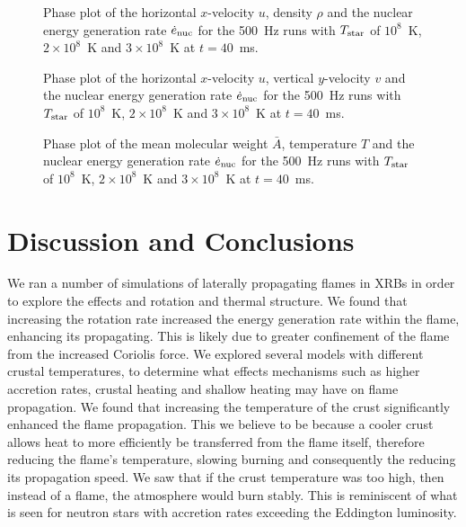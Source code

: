 \documentclass[preprint,times,tighten]{aastex63}
\begin{document}
\begin{figure}[t]
    \centering
    \caption{\label{fig:urho_hot}Phase plot of the horizontal $x$-velocity $u$, density $\rho$ and the nuclear energy generation rate $\dot{e}_{\rm nuc}$ for the 500~Hz runs with $T_{\rm star}$ of $10^8$~K, $2\times10^8$~K and $3\times10^8$~K at $t = 40$~ms.}
\end{figure}

\begin{figure}[t]
    \centering
    \caption{\label{fig:uv_hot}Phase plot of the horizontal $x$-velocity $u$, vertical $y$-velocity $v$ and the nuclear energy generation rate $\dot{e}_{\rm nuc}$ for the 500~Hz runs with $T_{\rm star}$ of $10^8$~K, $2\times10^8$~K and $3\times10^8$~K at $t = 40$~ms.}
\end{figure}

\begin{figure}[t]
    \centering
    \caption{\label{fig:abar_hot}Phase plot of the mean molecular weight $\bar{A}$, temperature $T$ and the nuclear energy generation rate $\dot{e}_{\rm nuc}$ for the 500~Hz runs with $T_{\rm star}$ of $10^8$~K, $2\times10^8$~K and $3\times10^8$~K at $t = 40$~ms.}
\end{figure}

\section{Discussion and Conclusions}\label{Sec:conclusions}

We ran a number of simulations of laterally propagating flames in XRBs in order to explore the effects and rotation and thermal structure. We found that increasing the rotation rate increased the energy generation rate within the flame, enhancing its propagating. This is likely due to greater confinement of the flame from the increased Coriolis force. We explored several models with different crustal temperatures, to determine what effects mechanisms such as higher accretion rates, crustal heating and shallow heating may have on flame propagation. We found that increasing the temperature of the crust significantly enhanced the flame propagation. This we believe to be because a cooler crust allows heat to more efficiently be transferred from the flame itself, therefore reducing the flame's temperature, slowing burning and consequently the reducing its propagation speed. We saw that if the crust temperature was too high, then instead of a flame, the atmosphere would burn stably. This is reminiscent of what is seen for neutron stars with accretion rates exceeding the Eddington luminosity.
\end{document}
